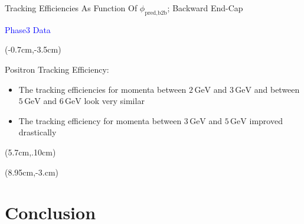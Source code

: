 \documentclass[8pt]{beamer}
\begin{document}
\begin{frame}{Tracking Efficiencies As Function Of $\phi_{\textrm{pred,b2b}}$; Backward End-Cap}
\begin{textblock*}{4cm}
		\textcolor{blue}{Phase3 Data}
	\end{textblock*}
	
	
	
	\begin{textblock*}{6cm}(-0.7cm,-3.5cm)
		
		
			\begin{mybox}
				Positron Tracking Efficiency:
				\begin{itemize}					
					\item The tracking efficiencies for momenta between $2\,\textrm{GeV}$ and $3\,\textrm{GeV}$ and between $5\,\textrm{GeV}$ and $6\,\textrm{GeV}$ look very similar
					
					\item<2,3> The tracking efficiency for momenta between $3\,\textrm{GeV}$ and $5\,\textrm{GeV}$ improved drastically 
				\end{itemize}
			\end{mybox}
		
	\end{textblock*}
	
	
	
			\begin{textblock*}{5cm}(5.7cm,.10cm)
	\end{textblock*}
	
	
	
	\begin{textblock*}{5cm}(8.95cm,-3.cm)
	\end{textblock*}
	
	
	
	
	
	\pause[3]
	
	
	
	
	
	
\end{frame}



\section{Conclusion}
\end{document}
